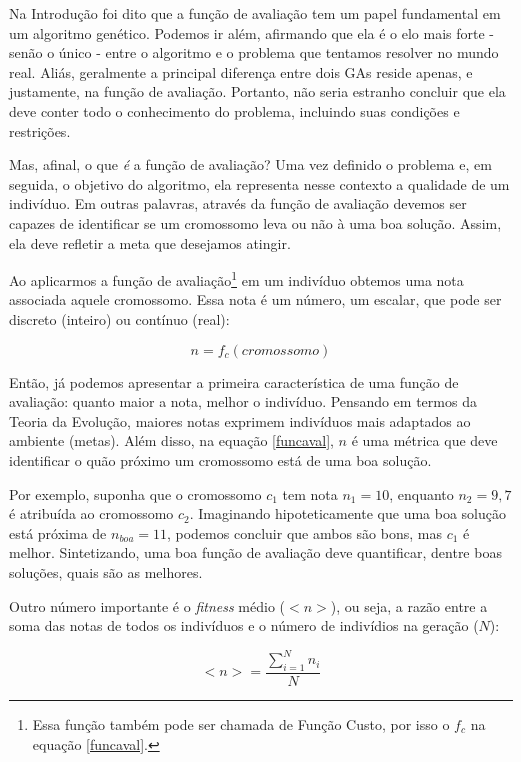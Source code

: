 	Na Introdução foi dito que a função de avaliação tem um papel fundamental em um algoritmo genético. Podemos ir além, afirmando que ela é o elo mais forte - senão o único - entre o algoritmo e o problema que tentamos resolver no mundo real. Aliás, geralmente a principal diferença entre dois GAs reside apenas, e justamente, na função de avaliação. Portanto, não seria estranho concluir que ela deve conter todo o conhecimento do problema, incluindo suas condições e restrições.
	
	Mas, afinal, o que \textit{é} a função de avaliação? Uma vez definido o problema e, em seguida, o objetivo do algoritmo, ela representa nesse contexto a qualidade de um indivíduo. Em outras palavras, através da função de avaliação devemos ser capazes de identificar se um cromossomo leva ou não à uma boa solução. Assim, ela deve refletir a meta que desejamos atingir.
	
	Ao aplicarmos a função de avaliação\footnote{Essa função também pode ser chamada de Função Custo, por isso o $f_c$ na equação \ref{funcaval}.} em um indivíduo obtemos uma nota associada aquele cromossomo. Essa nota é um número, um escalar, que pode ser discreto (inteiro) ou contínuo (real):
	
	\begin{equation}\label{funcaval}
		n = f_c(cromossomo)
	\end{equation}
	
	Então, já podemos apresentar a primeira característica de uma função de avaliação: quanto maior a nota, melhor o indivíduo. Pensando em termos da Teoria da Evolução, maiores notas exprimem indivíduos mais adaptados ao ambiente (metas). Além disso, na equação \ref{funcaval}, $n$ é uma métrica que deve identificar o quão próximo um cromossomo está de uma boa solução.
	
	Por exemplo, suponha que o cromossomo $c_1$ tem nota $n_1 = 10$, enquanto $n_2 = 9,7$ é atribuída ao cromossomo $c_2$. Imaginando hipoteticamente que uma boa solução está próxima de $n_{boa} = 11$, podemos concluir que ambos são bons, mas $c_1$ é melhor. Sintetizando, uma boa função de avaliação deve quantificar, dentre boas soluções, quais são as melhores.
	
	Outro número importante é o \textit{fitness} médio ($<n>$), ou seja, a razão entre a soma das notas de todos os indivíduos e o número de indivídios na geração ($N$):
	
	\begin{equation}\label{fitness_medio}
		<n> = \frac{\sum_{i = 1}^{N} n_i}{N}
	\end{equation}
	
